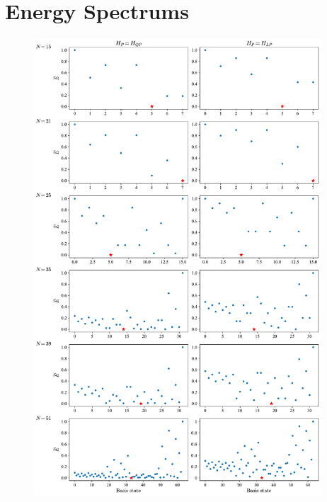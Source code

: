 \newpage
\section{Energy Spectrums}
\label{Section:EnergySpectrums}

\begin{figure}[H]
    \centering
    \includegraphics[width=0.96\textwidth]{06-appendix/figs/energy_spectrums_all1.pdf}
\end{figure}

